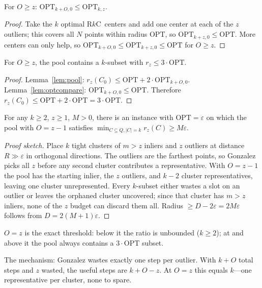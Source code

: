 \documentclass[twoside,leqno,twocolumn]{article}
\newcommand{\OPT}{\mathrm{OPT}}
\newcommand{\rz}{r_z}
\newcommand{\rkc}{R$k$C}
\begin{document}
\begin{lemma}
\label{lem:optcompare}
For $O\ge z$: $\OPT_{k+O,0}\le\OPT_{k,z}$.
\end{lemma}
\begin{proof}
Take the $k$ optimal \rkc\ centers and add one center at each of the
$z$ outliers; this covers all $N$ points within radius $\OPT$, so
$\OPT_{k+z,0}\le\OPT$. More centers can only help, so
$\OPT_{k+O,0}\le\OPT_{k+z,0}\le\OPT$ for $O\ge z$.
\end{proof}

\begin{theorem}[Sufficiency]
\label{thm:sufficiency}
For $O\ge z$, the pool contains a $k$-subset with $\rz\le3\cdot\OPT$.
\end{theorem}
\begin{proof}
Lemma~\ref{lem:pool}: $\rz(C_0)\le\OPT+2\cdot\OPT_{k+O,0}$.
Lemma~\ref{lem:optcompare}: $\OPT_{k+O,0}\le\OPT$. Therefore
$\rz(C_0)\le\OPT+2\cdot\OPT=3\cdot\OPT$.
\end{proof}

\begin{theorem}[Necessity]
\label{thm:necessity}
For any $k\ge2$, $z\ge1$, $M>0$, there is an instance with
$\OPT=\varepsilon$ on which the pool with $O=z-1$ satisfies
$\min_{C\subseteq Q,|C|=k}\rz(C)\ge M\varepsilon$.
\end{theorem}
\begin{proof}[Proof sketch]
Place $k$ tight clusters of $m>z$ inliers and $z$ outliers at distance
$R\gg\varepsilon$ in orthogonal directions. The outliers are the
farthest points, so Gonzalez picks all $z$ before any second cluster
contributes a representative. With $O=z-1$ the pool has the starting
inlier, the $z$ outliers, and $k-2$ cluster representatives, leaving
one cluster unrepresented. Every $k$-subset either wastes a slot on an
outlier or leaves the orphaned cluster uncovered; since that cluster
has $m>z$ inliers, none of the $z$ budget can discard them all.
Radius $\ge D-2\varepsilon=2M\varepsilon$ follows from $D=2(M{+}1)\varepsilon$.
\end{proof}

\begin{corollary}
\label{cor:phase}
$O=z$ is the exact threshold: below it the ratio is unbounded ($k\ge2$);
at and above it the pool always contains a $3\cdot\OPT$ subset.
\end{corollary}

The mechanism: Gonzalez wastes exactly one step per outlier. With
$k+O$ total steps and $z$ wasted, the useful steps are $k+O-z$. At
$O=z$ this equals $k$---one representative per cluster, none to spare.
\end{document}
